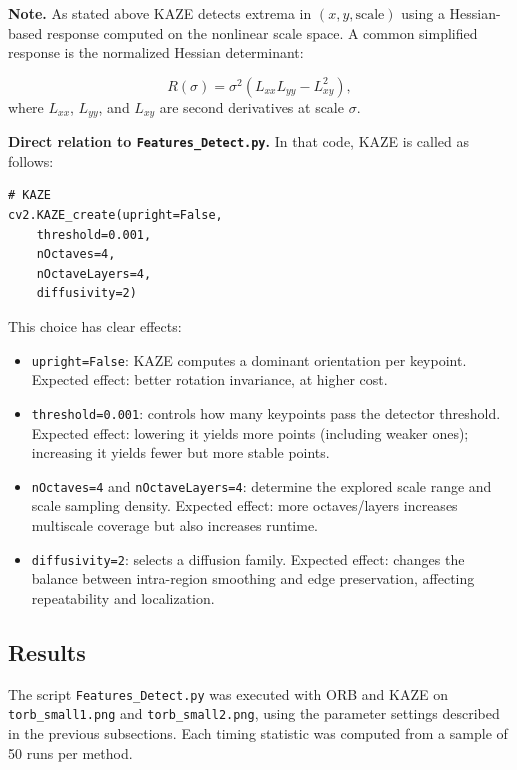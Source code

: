 \noindent \textbf{Note.} As stated above KAZE detects extrema in $(x,y,\text{scale})$ using a Hessian-based response computed on the nonlinear scale space. A common simplified response is the normalized Hessian determinant:

\begin{equation}
R(\sigma)=\sigma^2\left(L_{xx}L_{yy}-L_{xy}^2\right),
\end{equation}
where $L_{xx}$, $L_{yy}$, and $L_{xy}$ are second derivatives at scale $\sigma$.

\textbf{Direct relation to \texttt{Features\_Detect.py}.} In that code, KAZE is called as follows:

\begin{verbatim}
# KAZE
cv2.KAZE_create(upright=False,
    threshold=0.001,
    nOctaves=4,
    nOctaveLayers=4,
    diffusivity=2)
\end{verbatim}

This choice has clear effects:
\begin{itemize}
    \item \texttt{upright=False}: KAZE computes a dominant orientation per keypoint. Expected effect: better rotation invariance, at higher cost.
    \item \texttt{threshold=0.001}: controls how many keypoints pass the detector threshold. Expected effect: lowering it yields more points (including weaker ones); increasing it yields fewer but more stable points.
    \item \texttt{nOctaves=4} and \texttt{nOctaveLayers=4}: determine the explored scale range and scale sampling density. Expected effect: more octaves/layers increases multiscale coverage but also increases runtime.
    \item \texttt{diffusivity=2}: selects a diffusion family. Expected effect: changes the balance between intra-region smoothing and edge preservation, affecting repeatability and localization.
\end{itemize}


\subsection{Results}

The script \texttt{Features\_Detect.py} was executed with ORB and KAZE on
\texttt{torb\_small1.png} and \texttt{torb\_small2.png}, using the parameter
settings described in the previous subsections.
Each timing statistic was computed from a sample of 50 runs per method.


